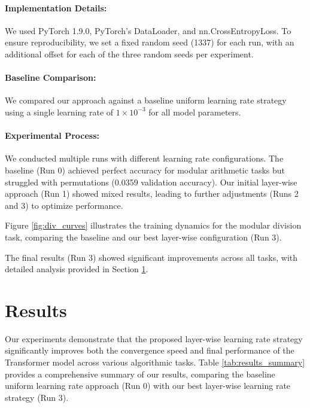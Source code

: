 \documentclass{article} %
\begin{document}
\paragraph{Implementation Details:} We used PyTorch 1.9.0, PyTorch's DataLoader, and nn.CrossEntropyLoss. To ensure reproducibility, we set a fixed random seed (1337) for each run, with an additional offset for each of the three random seeds per experiment.

\paragraph{Baseline Comparison:} We compared our approach against a baseline uniform learning rate strategy using a single learning rate of $1 \times 10^{-3}$ for all model parameters.

\paragraph{Experimental Process:} We conducted multiple runs with different learning rate configurations. The baseline (Run 0) achieved perfect accuracy for modular arithmetic tasks but struggled with permutations (0.0359 validation accuracy). Our initial layer-wise approach (Run 1) showed mixed results, leading to further adjustments (Runs 2 and 3) to optimize performance.

Figure \ref{fig:div_curves} illustrates the training dynamics for the modular division task, comparing the baseline and our best layer-wise configuration (Run 3).

The final results (Run 3) showed significant improvements across all tasks, with detailed analysis provided in Section \ref{sec:results}.

\section{Results}
\label{sec:results}

Our experiments demonstrate that the proposed layer-wise learning rate strategy significantly improves both the convergence speed and final performance of the Transformer model across various algorithmic tasks. Table \ref{tab:results_summary} provides a comprehensive summary of our results, comparing the baseline uniform learning rate approach (Run 0) with our best layer-wise learning rate strategy (Run 3).
\end{document}
